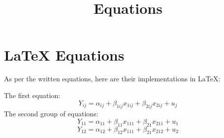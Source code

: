 \documentclass{article}
\title{Equations}
\begin{document}
\section{LaTeX Equations}
As per the written equations, here are their implementations in LaTeX:

\noindent The first equation:
\[ Y_{ij} = \alpha_{ij} + \beta_{1ij}x_{1ij} + \beta_{2ij}x_{2ij} + u_{j} \]
The second group of equations:
\[ Y_{11} = \alpha_{11} + \beta_{11}x_{111} + \beta_{21}x_{211} + u_{1} \]
\[ Y_{12} = \alpha_{12} + \beta_{12}x_{111} + \beta_{21}x_{212} + u_{2} \]
\end{document}
